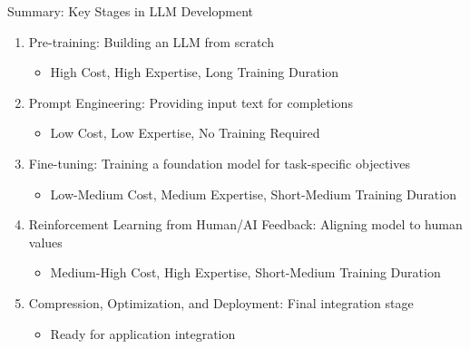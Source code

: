 \begin{frame}[fragile]{Summary: Key Stages in LLM Development}
    \begin{enumerate}
        \item Pre-training: Building an LLM from scratch
            \begin{itemize}
                \item High Cost, High Expertise, Long Training Duration
            \end{itemize}
        \item Prompt Engineering: Providing input text for completions
            \begin{itemize}
                \item Low Cost, Low Expertise, No Training Required
            \end{itemize}
        \item Fine-tuning: Training a foundation model for task-specific objectives
            \begin{itemize}
                \item Low-Medium Cost, Medium Expertise, Short-Medium Training Duration
            \end{itemize}
        \item Reinforcement Learning from Human/AI Feedback: Aligning model to human values
            \begin{itemize}
                \item Medium-High Cost, High Expertise, Short-Medium Training Duration
            \end{itemize}
        \item Compression, Optimization, and Deployment: Final integration stage
            \begin{itemize}
                \item Ready for application integration
            \end{itemize}
    \end{enumerate}
\end{frame}

